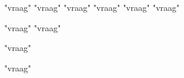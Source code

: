 \documentclass[12pt]{article}
\begin{document}
	
	{"vraag"}
			{"vraag"}
	{"vraag"}
	{"vraag"}
	{"vraag"}
	{"vraag"}
	
	{"vraag"}
	{"vraag"}

	{"vraag"}

	{"vraag"}
	
\end{document}
